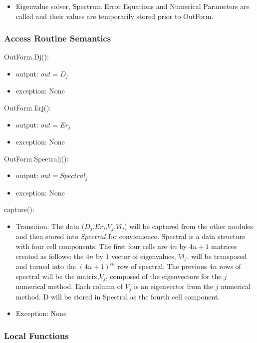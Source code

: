 \documentclass[12pt, titlepage]{article}
\begin{document}
\begin{itemize}
	\item Eigenvalue solver, Spectrum Error Equations and Numerical Parameters 
	are called and their values are temporarily stored prior to OutForm.
\end{itemize}

\subsubsection{Access Routine Semantics}

\noindent OutForm.Dj():
\begin{itemize}
	\item output: $out = D_{j}$
	\item exception: None
\end{itemize}

\noindent OutForm.Erj():
\begin{itemize}
	\item output: $out = Er_{j}$
	\item exception: None
\end{itemize} 

\noindent OutForm.Spectralj():
\begin{itemize}
	\item output: $out = Spectral_{j}$
	\item exception: None
\end{itemize}

\noindent capture():
\begin{itemize}
	\item Transition: The data ($D_{j}$,$Er_{j}$,$V_{j}$,$Vl_{j}$) will be 
	captured from the other 
	modules and then stored into $Spectral$ for convienience. Spectral is a 
	data 
	structure with four cell components. The first four cells are
	$4n$ by $4n + 1$ matrices created as follows: the $4n$ by $1$ vector of 
	eigenvalues, $Vl_j$, will be transposed and turned into the $(4n+1)^{th}$ 
	row 
	of 
	spectral. The previous $4n$ rows of spectral will be the matrix,$ V_j$, 
	composed 
	of the eigenvectors for the $j$ numerical method. Each column of $V_j$ is 
	an eigenvector from the $j$ numerical method. D will be stored in Spectral 
	as the fourth 
	cell component.  
	\item Exception: None
\end{itemize}  

\subsubsection{Local Functions}
\end{document}
